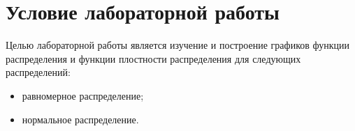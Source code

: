 \chapter*{Условие лабораторной работы}

Целью лабораторной работы является изучение и построение графиков функции распределения и функции плостности распределения для следующих распределений:
\begin{itemize}
	\item равномерное распределение;
	\item нормальное распределение.
\end{itemize}
	